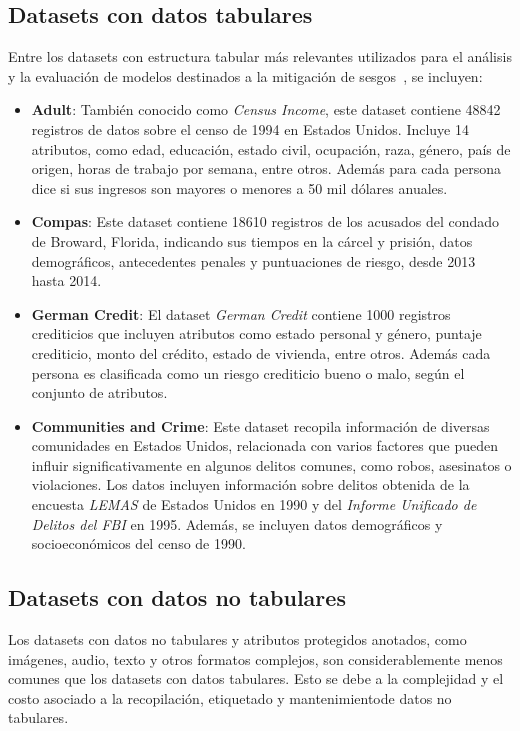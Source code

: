     \subsection{Datasets con datos tabulares}
    Entre los datasets con estructura tabular m\'as relevantes utilizados para el an\'alisis y la evaluaci\'on de modelos destinados 
    a la mitigaci\'on de sesgos~\parencite{calmon2017optimized,wang2023mitigating,compas}, se incluyen:

    \begin{itemize}
        \item \textbf{Adult}: Tambi\'en conocido como \textit{Census Income}, este dataset contiene 48842 registros de 
        datos sobre el censo de 1994 en Estados Unidos. Incluye 14 atributos, como edad, educaci\'on, estado civil,
        ocupaci\'on, raza, g\'enero, pa\'is de origen, horas de trabajo por semana, entre otros. Adem\'as para cada 
        persona dice si sus ingresos son mayores o menores a 50 mil d\'olares anuales.
        \item \textbf{Compas}: Este dataset contiene 18610 registros de los acusados del condado de Broward, Florida,
        indicando sus tiempos en la c\'arcel y prisi\'on, datos demogr\'aficos, antecedentes penales y puntuaciones 
        de riesgo, desde 2013 hasta 2014.
        \item \textbf{German Credit}: El dataset \textit{German Credit} contiene 1000 registros crediticios que incluyen atributos 
        como estado personal y g\'enero, puntaje crediticio, monto del cr\'edito, estado de vivienda, entre otros. Adem\'as cada 
        persona es clasificada como un riesgo crediticio bueno o malo, seg\'un el conjunto de atributos.
        \item \textbf{Communities and Crime}: Este dataset recopila informaci\'on de diversas comunidades en Estados Unidos, 
        relacionada con varios factores que pueden influir significativamente en algunos delitos comunes, como robos, asesinatos o 
        violaciones. Los datos incluyen informaci\'on sobre delitos obtenida de la encuesta \textit{LEMAS} de Estados Unidos en 1990 y 
        del \textit{Informe Unificado de Delitos del FBI} en 1995. Adem\'as, se incluyen datos demogr\'aficos y socioecon\'omicos del 
        censo de 1990.

    \end{itemize}

    \subsection{Datasets con datos no tabulares}
    Los datasets con datos no tabulares y atributos protegidos anotados, como im\'agenes, audio, texto y otros formatos complejos, 
    son considerablemente menos comunes que los datasets con datos tabulares. Esto se debe a la complejidad y el costo asociado a la 
    recopilaci\'on, etiquetado y mantenimientode datos no tabulares.

